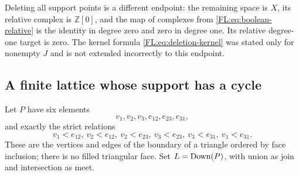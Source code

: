 Deleting all support points is a different endpoint: the remaining
space is $X$, its relative complex is $\mathbb Z[0]$, and the map of
complexes from \eqref{FL:eq:boolean-relative} is the identity in degree
zero and zero in degree one. Its relative degree-one target is zero.
The kernel formula \eqref{FL:eq:deletion-kernel} was stated only for
nonempty $J$ and is not extended incorrectly to this endpoint.

\subsection{A finite lattice whose support has a cycle}

Let $P$ have six elements
\[
 v_1,v_2,v_3,e_{12},e_{23},e_{31},
\]
and exactly the strict relations
\[
 v_1<e_{12},\ v_2<e_{12},\ v_2<e_{23},\ v_3<e_{23},\
 v_3<e_{31},\ v_1<e_{31}.
 \tag{FL32}\label{FL:eq:triangle-relations}
\]
These are the vertices and edges of the boundary of a triangle ordered
by face inclusion; there is no filled triangular face. Set
$L=\operatorname{Down}(P)$, with union as join and intersection as meet.

